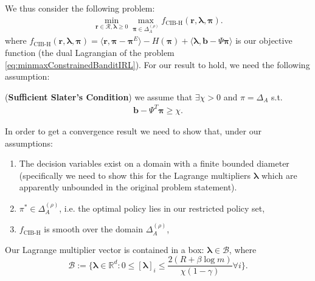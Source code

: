 We thus consider the following problem:
\begin{equation}
    \label{eq:dualConstrainedBanditIRLShannon}
    \begin{aligned}
        \min_{\bm{r}\in\mathcal{R},\bm{\lambda} \geq 0}\max_{\bm{\pi}\in\Delta_{A}^{(\rho)}} f_\text{CIB-H}(\bm{r},\bm{\lambda},\bm{\pi}).
    \end{aligned}
\end{equation}
where $f_\text{CIB-H}(\bm{r},\bm{\lambda},\bm{\pi}) = \langle \bm{r}, \bm{\pi}-\bm{\pi}^E\rangle - H(\bm{\pi}) + \langle \bm{\lambda}, \bm{b}-\Psi \bm{\pi} \rangle$ is our objective function (the dual Lagrangian of the problem \ref{eq:minmaxConstrainedBanditIRL}). For our result to hold, we need the following assumption:
\begin{assumption}
    \label{assumption:slater_with_margin_bandit}
    (\textbf{Sufficient Slater's Condition}) we assume that $\exists \chi > 0$ and $\pi = \Delta_A$ s.t.
    \begin{align*}
        \bm{b} - \Psi^T \bm{\pi} \geq \chi.
    \end{align*}
\end{assumption}
\noindent
In order to get a convergence result we need to show that, under our assumptions:
\begin{enumerate}
    \item The decision variables exist on a domain with a finite bounded diameter (specifically we need to show this for the Lagrange multipliers $\bm{\lambda}$ which are apparently unbounded in the original problem statement).
    \item $\pi^* \in \Delta_{A}^{(\rho)}$, i.e. the optimal policy lies in our restricted policy set,
    \item $f_\text{CIB-H}$ is smooth over the domain $\Delta_{A}^{(\rho)}$,
\end{enumerate}


\begin{proposition}
    \label{prop:bounded_lambda} Our Lagrange multiplier vector is contained in a box: $\bm{\lambda} \in \mathcal{B}$, where 
    \[ \mathcal{B} := \Bigg\{ \bm{\lambda}\in\mathbb{R}^d : 0\leq[\bm{\lambda}]_i  \leq \frac{2(R +\beta \log m)}{\chi (1-\gamma)} \forall i \Bigg\}.\]
\end{proposition}

